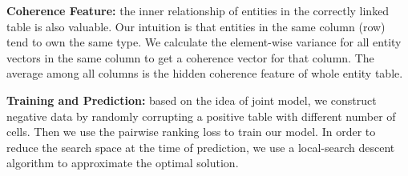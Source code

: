 \noindent
\textbf{Coherence Feature:}
the inner relationship of entities in the correctly linked table is also valuable. Our intuition is that entities in the same column (row) tend to own the same type.
We calculate the element-wise variance for all entity vectors in the same column
to get a coherence vector for that column.
The average among all columns is the hidden coherence feature of whole entity table.

\noindent
\textbf{Training and Prediction:}
based on the idea of joint model, we construct negative data by randomly corrupting a positive table with different number of cells.
Then we use the pairwise ranking loss to train our model.
In order to reduce the search space at the time of prediction,
we use a local-search descent algorithm to approximate the optimal solution.
